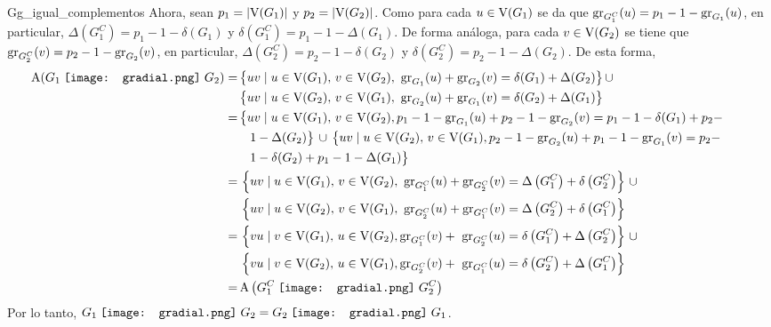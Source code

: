 \documentclass[fleqn, 11pt]{beamer}
\newcommand{\gradial}{\hspace{0.9mm} \texttt{[image: gradial.png]} \hspace{1mm}}
\begin{document}
\begin{teorema}[breakable, pad at break = 4mm, beforeafter skip = 4mm]{}{Gg_igual_complementos}
        Ahora, sean $ p_1 = \left\lvert \textnormal{V}(G_1) \right\rvert $ y $ p_2 = \left\lvert \textnormal{V}(G_2) \right\rvert $. Como para cada $ u \in \textnormal{V}(G_1) $ se da que $ \textnormal{gr}_{G_1^C}(u) = p_1 - 1 - \textnormal{gr}_{G_1}(u) $, en particular, $ \Delta\left( G_1^C \right) = p_1 - 1 - \delta(G_1) $ y $ \delta\left( G_1^C \right) = p_1 - 1 - \Delta(G_1) $. De forma análoga, para cada $ v \in \textnormal{V}(G_2) $ se tiene que $ \textnormal{gr}_{G_2^C}(v) = p_2 - 1 - \textnormal{gr}_{G_2}(v) $, en particular, $ \Delta\left( G_2^C \right) = p_2 - 1 - \delta(G_2) $ y $ \delta\left( G_2^C \right) = p_2 - 1 - \Delta(G_2) $. De esta forma,
        \begin{align*}
            \hspace{-7mm} \textnormal{A}(G_1 \gradial G_2) =& \, \bigl\{ uv \mid u \in \textnormal{V}(G_1), \, v \in \textnormal{V}(G_2), \textnormal{ gr}_{G_1}(u) + \textnormal{gr}_{G_2}(v) = \delta(G_1) + \Delta(G_2) \bigr\} \, \cup \\
            & \, \bigl\{ uv \mid u \in \textnormal{V}(G_2), \, v \in \textnormal{V}(G_1), \textnormal{ gr}_{G_2}(u) + \textnormal{gr}_{G_1}(v) = \delta(G_2) + \Delta(G_1) \bigr\} \\
            =& \, \bigl\{ uv \mid u \in \textnormal{V}(G_1), \, v \in \textnormal{V}(G_2), p_1 - 1 - \textnormal{gr}_{G_1}(u) + p_2 - 1 - \textnormal{gr}_{G_2}(v) = p_1 - 1 - \delta(G_1) + p_2 \bigr. - \\ 
            & \quad 1 - \Delta(G_2) \bigr\} \, \cup \, \bigl\{ uv \mid u \in \textnormal{V}(G_2), \, v \in \textnormal{V}(G_1), p_2 - 1 - \textnormal{gr}_{G_2}(u) + p_1 - 1 - \textnormal{gr}_{G_1}(v) = p_2 - \\
            & \quad \bigl. 1 - \delta(G_2) + p_1 - 1 - \Delta(G_1) \bigr\} \\
            =& \, \left\lbrace uv \mid u \in \textnormal{V}(G_1), \, v \in \textnormal{V}(G_2), \textnormal{ gr}_{G_1^C}(u) + \textnormal{gr}_{G_2^C}(v) = \Delta\left( G_1^C \right) + \delta\left( G_2^C \right) \right\rbrace \, \cup \\
            & \, \left\lbrace uv \mid u \in \textnormal{V}(G_2), \, v \in \textnormal{V}(G_1), \textnormal{ gr}_{G_2^C}(u) + \textnormal{gr}_{G_1^C}(v) = \Delta\left( G_2^C \right) + \delta\left( G_1^C \right) \right\rbrace \\
            =& \, \left\lbrace vu \mid v \in \textnormal{V}(G_1), \, u \in \textnormal{V}(G_2), \textnormal{gr}_{G_1^C}(v) + \textnormal{ gr}_{G_2^C}(u) = \delta\left( G_1^C \right) + \Delta\left( G_2^C \right) \right\rbrace \, \cup \\
            & \, \left\lbrace vu \mid v \in \textnormal{V}(G_2), \, u \in \textnormal{V}(G_1), \textnormal{gr}_{G_2^C}(v) + \textnormal{ gr}_{G_1^C}(u) = \delta\left( G_2^C \right) + \Delta\left( G_1^C \right) \right\rbrace \\
            =& \, \textnormal{A}\left( G_1^C \gradial G_2^C \right)
        \end{align*}
        Por lo tanto, $ G_1 \gradial G_2 = G_2 \gradial G_1 $.
    \end{teorema}
\end{document}

